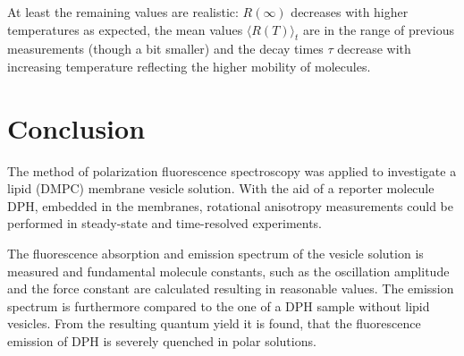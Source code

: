 \documentclass{scrartcl}
\numberwithin{equation}{section}
\numberwithin{figure}{section}
\numberwithin{table}{section}
\begin{document}
At least the remaining values are realistic: $R(\infty)$ decreases with higher temperatures as expected, the mean values $\langle R(T) \rangle_t$ are in the range of previous measurements (though a bit smaller) and the decay times $\tau$ decrease with increasing temperature reflecting the higher mobility of molecules.

\section{Conclusion}
The method of polarization fluorescence spectroscopy was applied to investigate a lipid (DMPC) membrane vesicle solution. With the aid of a reporter molecule DPH, embedded in the membranes, rotational anisotropy measurements could be performed in steady-state and time-resolved experiments. 

The fluorescence absorption and emission spectrum of the vesicle solution is measured and fundamental molecule constants, such as the oscillation amplitude and the force constant are calculated resulting in reasonable values. The emission spectrum is furthermore compared to the one of a DPH sample without lipid vesicles. From the resulting quantum yield it is found, that the fluorescence emission of DPH is severely quenched in polar solutions.   
\end{document}
